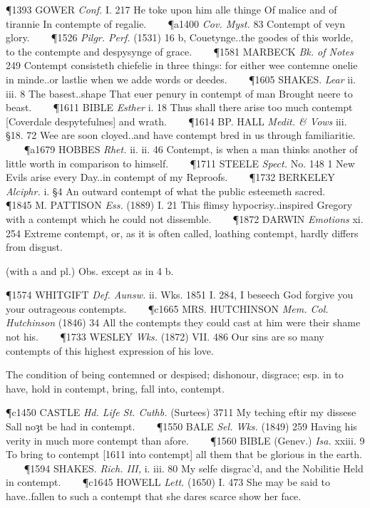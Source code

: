 \begin{description}[wide, labelwidth=!, labelindent=0pt]
\begin{myenumerate}
\P 1393 GOWER  \textit{Conf.} I. 217 He toke upon him alle thinge Of malice and of tirannie In contempte of regalie.    
\P a1400 \textit{Cov.  Myst.} 83 Contempt of veyn glory.    
\P 1526  \textit{Pilgr. Perf.} (1531) 16 b, Couetynge..the goodes of this worlde, to the contempte and despysynge of grace.    
\P 1581 MARBECK  \textit{Bk. of Notes} 249 Contempt consisteth chiefelie in three things: for either wee contemne onelie in minde..or lastlie when we adde words or deedes.    
\P 1605 SHAKES.  \textit{Lear} ii. iii. 8 The basest..shape That euer penury in contempt of man Brought neere to beast.    
\P 1611 BIBLE  \textit{Esther} i. 18 Thus shall there arise too much contempt [Coverdale despytefulnes] and wrath.    
\P 1614 BP. HALL  \textit{Medit. \& Vows} iii. §18. 72 Wee are soon cloyed..and have contempt bred in us through familiaritie.    
\P a1679 HOBBES  \textit{Rhet.} ii. ii. 46 Contempt, is when a man thinks another of little worth in comparison to himself.    
\P 1711 STEELE  \textit{Spect.} No. 148 1 New Evils arise every Day..in contempt of my Reproofs.    
\P 1732 BERKELEY  \textit{Alciphr.} i. §4 An outward contempt of what the public esteemeth sacred.    
\P 1845 M. PATTISON  \textit{Ess.} (1889) I. 21 This flimsy hypocrisy..inspired Gregory with a contempt which he could not dissemble.    
\P 1872 DARWIN  \textit{Emotions} xi. 254 Extreme contempt, or, as it is often called, loathing contempt, hardly differs from disgust.

 (with a and pl.) Obs. except as in 4 b.

\P 1574 WHITGIFT  \textit{Def. Aunsw.} ii. Wks. 1851 I. 284,  I beseech God forgive you your outrageous contempts.    
\P c1665 MRS. HUTCHINSON  \textit{Mem. Col. Hutchinson} (1846) 34 All the contempts they could cast at him were their shame not his.    
\P 1733 WESLEY  \textit{Wks.} (1872) VII. 486 Our sins are so many contempts of this highest expression of his love.

 The condition of being contemned or despised; dishonour, disgrace; esp. in to have, hold in contempt, bring, fall into, contempt.

\P c1450 CASTLE  \textit{Hd. Life St. Cuthb.} (Surtees) 3711 My teching eftir my dissese Sall noȝt be had in contempt.    
\P 1550 BALE  \textit{Sel. Wks.} (1849) 259 Having his verity in much more contempt than afore.    
\P 1560 BIBLE  (Genev.) \textit{Isa.} xxiii. 9 To bring to contempt [1611 into  contempt] all them that be glorious in the earth.    
\P 1594 SHAKES.  \textit{Rich. III,} i. iii. 80 My selfe disgrac'd, and the Nobilitie Held in contempt.    
\P c1645 HOWELL  \textit{Lett.} (1650) I. 473 She may be said to have..fallen to such a contempt that she dares scarce show her face.


\end{myenumerate}
\end{description}
